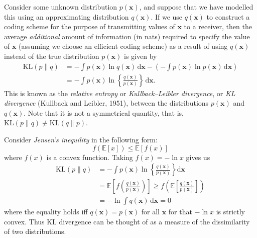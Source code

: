 Consider some unknown distribution \( p(\mathbf{x}) \), and suppose that we have modelled this using an approximating distribution \( q(\mathbf{x}) \). If we use \( q(\mathbf{x}) \) to construct a coding scheme for the purpose of transmitting values of \( \mathbf{x} \) to a receiver, then the average \textit{additional} amount of information (in nats) required to specify the value of \( \mathbf{x} \) (assuming we choose an efficient coding scheme) as a result of using \( q(\mathbf{x}) \) instead of the true distribution \( p(\mathbf{x}) \) is given by
\begin{align*}
  \mathrm{KL}(p \parallel q)
   & = - \int p(\mathbf{x}) \ln q(\mathbf{x}) \, \mathrm{d}\mathbf{x}
  - \left( - \int p(\mathbf{x}) \ln p(\mathbf{x}) \, \mathrm{d}\mathbf{x} \right)                             \\
   & = - \int p(\mathbf{x}) \ln \left\{ \frac{q(\mathbf{x})}{p(\mathbf{x})} \right\} \, \mathrm{d}\mathbf{x}.
\end{align*}
This is known as the \textit{relative entropy} or \textit{Kullback--Leibler divergence}, or \textit{KL divergence} (Kullback and Leibler, 1951), between the distributions \( p(\mathbf{x}) \) and \( q(\mathbf{x}) \). Note that it is not a symmetrical quantity, that is, \( \mathrm{KL}(p \parallel q) \not\equiv \mathrm{KL}(q \parallel p) \).

Consider \textit{Jensen's inequility} in the following form:
\[
  f\left(\mathbb E[x]\right)\leq \mathbb E[f(x)]
\]
where $f(x)$ is a convex function. Taking $f(x)=-\ln x$ gives us
\begin{align*}
  \mathrm{KL}(p\|q) & =-\int p(\mathbf{x})\ln\left\{\frac{q(\mathbf{x})}{p(\mathbf{x})}\right\}\mathrm{d}\mathbf{x}                                    \\&
  =\mathbb E\left[f\left(\frac{q(\mathbf{x})}{p(\mathbf{x})}\right)\right]\geq f\left(\mathbb E\left[\frac{q(\mathbf{x})}{p(\mathbf{x})}\right]\right) \\&
  =-\ln\int q(\mathbf{x})\,\mathrm{d}\mathbf{x}=0
\end{align*}
where the equality holds iff $q(\mathbf{x})=p(\mathbf{x})$ for all $\mathbf{x}$ for that $-\ln x$ is strictly convex. Thus KL divergence can be thought of as a measure of the dissimilarity of two distributions.

